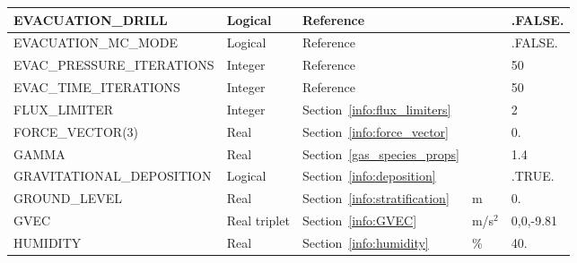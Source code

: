 \documentclass[11pt]{book}
\begin{document}
\begin{longtable}{@{\extracolsep{\fill}}|l|l|l|l|l|}
{\ct EVACUATION\_DRILL}                         & Logical       & Reference~\cite{FDS_Evac_Users_Guide}                 &               & {\ct .FALSE.}     \\ \hline
{\ct EVACUATION\_MC\_MODE}                      & Logical       & Reference~\cite{FDS_Evac_Users_Guide}                 &               & {\ct .FALSE.}     \\ \hline
{\ct EVAC\_PRESSURE\_ITERATIONS}                & Integer       & Reference~\cite{FDS_Evac_Users_Guide}                 &               & 50                \\ \hline
{\ct EVAC\_TIME\_ITERATIONS}                    & Integer       & Reference~\cite{FDS_Evac_Users_Guide}                 &               & 50                \\ \hline
{\ct FLUX\_LIMITER}                             & Integer       & Section~\ref{info:flux_limiters}                      &               & 2                 \\ \hline
{\ct FORCE\_VECTOR(3)}                          & Real          & Section~\ref{info:force_vector}                       &               & 0.                \\ \hline
{\ct GAMMA}                                     & Real          & Section~\ref{gas_species_props}                       &               & 1.4               \\ \hline
{\ct GRAVITATIONAL\_DEPOSITION}                 & Logical       & Section~\ref{info:deposition}                         &               & {\ct .TRUE.}      \\ \hline
{\ct GROUND\_LEVEL}                             & Real          & Section~\ref{info:stratification}                     & m             & 0.                \\ \hline
{\ct GVEC}                                      & Real triplet  & Section~\ref{info:GVEC}                               & m/s$^2$       & 0,0,-9.81         \\ \hline
{\ct HUMIDITY}                                  & Real           & Section~\ref{info:humidity}                          & \%                & 40.           \\ \hline

\end{longtable}
\end{document}
